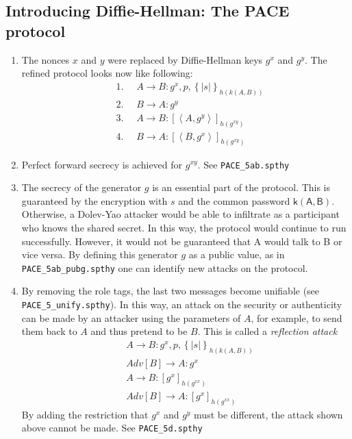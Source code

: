 \documentclass[a4paper,11pt]{scrartcl}
\newcommand{\tuple}[1]{\left\langle #1\right\rangle}
\begin{document}
\subsection{Introducing Diffie-Hellman: The PACE protocol}
\begin{enumerate}[label=\alph*)]
	\item The nonces $x$ and $y$ were replaced by Diffie-Hellman keys $g^x$ and $g^y$. The refined protocol looks now like following:
	  \begin{align*}
    		&\text{1. }\quad A \rightarrow B: g^x, p, \left\lbrace | s | \right\rbrace_{h(k(A,  B))}\\
		&\text{2. }\quad B \rightarrow A: g^y\\
		&\text{3. }\quad A \rightarrow B: [\tuple{A,  g^y}]_{h(g^{xy})}\\
		&\text{4. }\quad B \rightarrow A: [\tuple{B,  g^x}]_{h(g^{xy})}
  	\end{align*}
	\item Perfect forward secrecy is achieved for $g^{xy}$.  \newline
	See \texttt{PACE\_5ab.spthy}
	\item The secrecy of the generator $g$ is an essential part of the protocol. This is guaranteed by the encryption with $s$ and the common password $\mathsf{k(A,B)}$.  Otherwise, a Dolev-Yao attacker would be able to infiltrate as a participant who knows the shared secret.  In this way, the protocol would continue to run successfully. However, it would not be guaranteed that A would talk to B or vice versa.  By defining this generator $g$ as a public value, as in \texttt{PACE\_5ab\_pubg.spthy} one can identify new attacks on the protocol.
	\item By removing the role tags, the last two messages become unifiable (see \texttt{PACE\_5\_unify.spthy}).  In this way,  an attack on the security or authenticity can be made by an attacker using the parameters of $A$,  for example, to send them back to $A$ and thus pretend to be $B$. This is called a \emph{reflection attack}
	\begin{align*}
    		&A \rightarrow B: g^x, p, \left\lbrace | s | \right\rbrace_{h(k(A,  B))}\\
		&Adv[B] \rightarrow A: g^x\\
		&A \rightarrow B: [g^x]_{h(g^{xx})}\\
		&Adv[B] \rightarrow A: [g^x]_{h(g^{xx})}
  	\end{align*}
	By adding the restriction that $g^x$ and $g^y$ must be different,  the attack shown above cannot be made. \newline
See \texttt{PACE\_5d.spthy}
\end{enumerate}
\newpage
\end{document}
